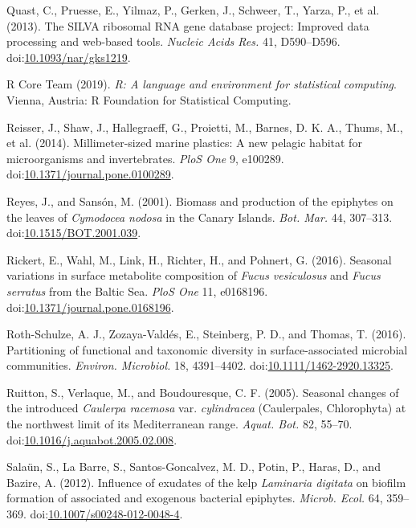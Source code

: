 \documentclass[12pt,]{article}
\begin{document}
\leavevmode\hypertarget{ref-Quast2013}{}%
Quast, C., Pruesse, E., Yilmaz, P., Gerken, J., Schweer, T., Yarza, P.,
et al. (2013). The SILVA ribosomal RNA gene database project: Improved
data processing and web-based tools. \emph{Nucleic Acids Res.} 41,
D590--D596.
doi:\href{https://doi.org/10.1093/nar/gks1219}{10.1093/nar/gks1219}.

\leavevmode\hypertarget{ref-RCoreTeam2019}{}%
R Core Team (2019). \emph{R: A language and environment for statistical
computing}. Vienna, Austria: R Foundation for Statistical Computing.

\leavevmode\hypertarget{ref-Reisser2014}{}%
Reisser, J., Shaw, J., Hallegraeff, G., Proietti, M., Barnes, D. K. A.,
Thums, M., et al. (2014). Millimeter-sized marine plastics: A new
pelagic habitat for microorganisms and invertebrates. \emph{PloS One} 9,
e100289.
doi:\href{https://doi.org/10.1371/journal.pone.0100289}{10.1371/journal.pone.0100289}.

\leavevmode\hypertarget{ref-Reyes2001}{}%
Reyes, J., and Sansón, M. (2001). Biomass and production of the
epiphytes on the leaves of \emph{Cymodocea nodosa} in the Canary
Islands. \emph{Bot. Mar.} 44, 307--313.
doi:\href{https://doi.org/10.1515/BOT.2001.039}{10.1515/BOT.2001.039}.

\leavevmode\hypertarget{ref-Rickert2016}{}%
Rickert, E., Wahl, M., Link, H., Richter, H., and Pohnert, G. (2016).
Seasonal variations in surface metabolite composition of \emph{Fucus
vesiculosus} and \emph{Fucus serratus} from the Baltic Sea. \emph{PloS
One} 11, e0168196.
doi:\href{https://doi.org/10.1371/journal.pone.0168196}{10.1371/journal.pone.0168196}.

\leavevmode\hypertarget{ref-Roth-Schulze2016}{}%
Roth-Schulze, A. J., Zozaya-Valdés, E., Steinberg, P. D., and Thomas, T.
(2016). Partitioning of functional and taxonomic diversity in
surface-associated microbial communities. \emph{Environ. Microbiol.} 18,
4391--4402.
doi:\href{https://doi.org/10.1111/1462-2920.13325}{10.1111/1462-2920.13325}.

\leavevmode\hypertarget{ref-Ruitton2005}{}%
Ruitton, S., Verlaque, M., and Boudouresque, C. F. (2005). Seasonal
changes of the introduced \emph{Caulerpa racemosa} var.
\emph{cylindracea} (Caulerpales, Chlorophyta) at the northwest limit of
its Mediterranean range. \emph{Aquat. Bot.} 82, 55--70.
doi:\href{https://doi.org/10.1016/j.aquabot.2005.02.008}{10.1016/j.aquabot.2005.02.008}.

\leavevmode\hypertarget{ref-Salaun2012}{}%
Salaün, S., La Barre, S., Santos-Goncalvez, M. D., Potin, P., Haras, D.,
and Bazire, A. (2012). Influence of exudates of the kelp \emph{Laminaria
digitata} on biofilm formation of associated and exogenous bacterial
epiphytes. \emph{Microb. Ecol.} 64, 359--369.
doi:\href{https://doi.org/10.1007/s00248-012-0048-4}{10.1007/s00248-012-0048-4}.
\end{document}
